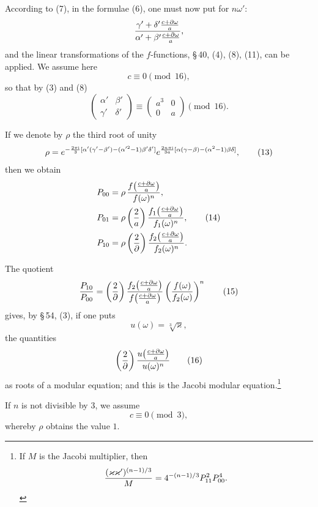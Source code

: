 \documentclass[11pt]{article}
\providecommand{\ii}{\mathrm{i}}
\begin{document}
According to (7), in the formulae (6), one must now put for $n\omega'$:
\[
{\gamma'+\delta'{c+\partial\omega\over a}\over
\alpha'+\beta'{c+\partial\omega\over a}},
\]
and the linear transformations of the $f$-functions, \S\,40, (4), (8), (11), can be applied. We assume here
\begin{equation}
c\equiv0\pmod {16},
\tag{12}
\end{equation}
so that by (3) and (8)
\[
\begin{pmatrix}\alpha'&\beta'\\\gamma'&\delta'\end{pmatrix}
\equiv
\begin{pmatrix}a^3&0\\0&a\end{pmatrix}\pmod {16}.
\]

If we denote by $\rho$ the third root of unity
\begin{equation}
\rho=e^{-{2\pi\ii\over3}[\alpha'(\gamma'-\beta')-(\alpha'^2-1)\beta'\delta']}
 e^{{2n\pi\ii\over3a}[\alpha(\gamma-\beta)-(\alpha^2-1)\beta\delta]},
\tag{13}
\end{equation}
then we obtain
\begin{align}
P_{00}&=\rho\,{f\!\left({c+\partial\omega\over a}\right)\over f(\omega)^n},\notag\\
P_{01}&=\rho\left({2\over a}\right){f_1\!\left({c+\partial\omega\over a}\right)\over f_1(\omega)^n},\tag{14}\\
P_{10}&=\rho\left({2\over\partial}\right){f_2\!\left({c+\partial\omega\over a}\right)\over f_2(\omega)^n}.\notag
\end{align}

The quotient
\begin{equation}
{P_{10}\over P_{00}}=
\left({2\over\partial}\right)
{f_2\!\left({c+\partial\omega\over a}\right)\over f\!\left({c+\partial\omega\over a}\right)}
\left({f(\omega)\over f_2(\omega)}\right)^n
\tag{15}
\end{equation}
gives, by \S\,54, (3), if one puts
\[
u(\omega)=\sqrt[3]{\varkappa},
\]
the quantities
\begin{equation}
\left({2\over\partial}\right)
{u\!\left({c+\partial\omega\over a}\right)\over u(\omega)^n}
\tag{16}
\end{equation}
as roots of a modular equation; and this is the Jacobi modular equation.\footnote{If $M$ is the Jacobi multiplier, then
\[
{(\varkappa\varkappa')^{(n-1)/3}\over M}=4^{-(n-1)/3}P_{11}^2P_{00}^4.
\]}

If $n$ is not divisible by $3$, we assume
\begin{equation}
c\equiv0\pmod3,
\tag{17}
\end{equation}
whereby $\rho$ obtains the value $1$.
\end{document}
